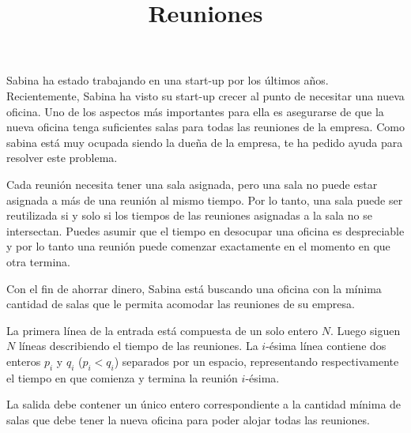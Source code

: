 \documentclass{oci}
\title{Reuniones}
\begin{document}
\begin{problemDescription}
  Sabina ha estado trabajando en una start-up por los últimos años.
  Recientemente, Sabina ha visto su start-up crecer al punto de necesitar una
  nueva oficina.
  Uno de los aspectos más importantes para ella es
  asegurarse de que la nueva oficina tenga suficientes salas para todas las
  reuniones de la empresa.
  Como sabina está muy ocupada siendo la dueña de la empresa, te ha pedido
  ayuda para resolver este problema.

  Cada reunión necesita tener una sala asignada, pero una sala no
  puede estar asignada a más de una reunión al mismo tiempo.
  Por lo tanto, una sala puede ser reutilizada si y solo si los tiempos de las
  reuniones asignadas a la sala no se intersectan.
  Puedes asumir que el tiempo en desocupar una oficina es despreciable y por
  lo tanto una reunión puede comenzar exactamente en el momento en que otra
  termina.

  Con el fin de ahorrar dinero, Sabina está buscando una oficina con la mínima
  cantidad de salas que le permita acomodar las reuniones de su empresa.
\end{problemDescription}

\begin{inputDescription}
    La primera línea de la entrada está compuesta de un solo entero $N$.
    Luego siguen $N$ líneas describiendo el tiempo de las reuniones.
    La $i$-ésima línea contiene dos enteros $p_i$ y $q_i$ ($p_i < q_i$)
    separados por un espacio, representando respectivamente el tiempo en que
    comienza y termina la reunión $i$-ésima.
\end{inputDescription}

\begin{outputDescription}
    La salida debe contener un único entero correspondiente a la cantidad
    mínima de salas que debe tener la nueva oficina para poder alojar todas las
    reuniones.
\end{outputDescription}
\end{document}
